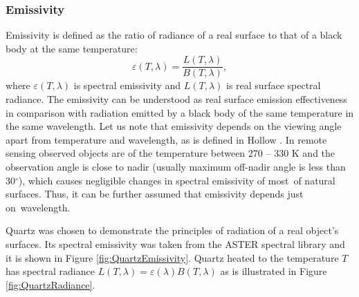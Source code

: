 \subsubsection*{Emissivity}
Emissivity is defined as the ratio of radiance of a real surface to that of a black body at the same temperature:
$$ \varepsilon(T,\lambda) = \frac{L(T,\lambda)}{B(T,\lambda)},$$
where $\varepsilon(T,\lambda)$ is spectral emissivity and $L(T,\lambda)$ is real surface spectral radiance. The emissivity can be understood as real surface emission effectiveness in comparison with radiation emitted by a black body of the same temperature in the same wavelength. Let us note that emissivity depends on the viewing angle apart from temperature and wavelength, as is defined in Hollow \cite{H11}. In remote sensing observed objects are of the temperature between 270 – 330 K and the observation angle is close to nadir (usually maximum off-nadir angle is less than 30$^\circ$), which causes negligible changes in spectral emissivity of most~of natural surfaces. Thus, it can be further assumed that emissivity depends just on~wavelength. 

Quartz was chosen to demonstrate the principles of radiation of a real object's surfaces. Its spectral emissivity was taken from the ASTER spectral library \cite{BH09} and it is shown in Figure \ref{fig:QuartzEmissivity}. Quartz heated to the temperature $T$ has spectral radiance $L(T,\lambda) = \varepsilon(\lambda) B(T,\lambda)$ as is illustrated in Figure \ref{fig:QuartzRadiance}. 


